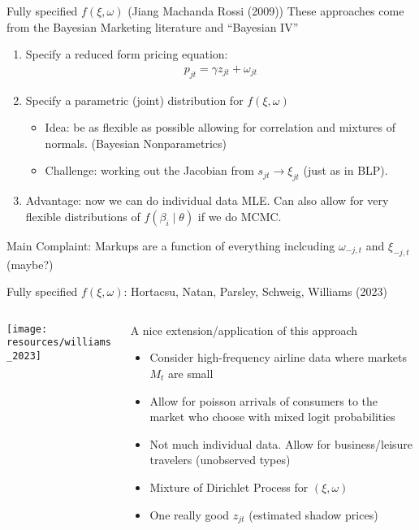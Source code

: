 \begin{frame}{Fully specified $f(\xi,\omega)$ (Jiang Machanda Rossi (2009))}
These approaches come from the Bayesian Marketing literature and ``Bayesian IV''
\begin{enumerate}
    \item Specify a reduced form pricing equation:
    \begin{align*}
        p_{jt} = \gamma z_{jt}  + \omega_{jt}
    \end{align*}
    \item Specify a parametric (joint) distribution for $f(\xi, \omega)$
    \begin{itemize}
        \item Idea: be as flexible as possible allowing for correlation and mixtures of normals. (Bayesian Nonparametrics)
        \item Challenge: working out the Jacobian from $s_{jt} \rightarrow \xi_{jt}$ (just as in BLP).
    \end{itemize}
    \item Advantage: now we can do individual data MLE. Can also allow for very flexible distributions of $f(\beta_i \mid \theta)$ if we do MCMC.
\end{enumerate}
Main Complaint: Markups are a function of \alert{everything} inclcuding $\omega_{-j,t}$ and $\xi_{-j,t}$ (maybe?)
\end{frame}

\begin{frame}{Fully specified $f(\xi,\omega)$: Hortacsu, Natan, Parsley, Schweig, Williams (2023)}

\begin{columns}
\begin{column}{0.5\textwidth}
     \texttt{[image: resources/williams\_2023]}      
\end{column}
\begin{column}{0.5\textwidth}
A nice extension/application of this approach
\begin{itemize}
    \item Consider high-frequency airline data where markets $M_t$ are \alert{small}
    \item Allow for poisson arrivals of consumers to the market who choose with mixed logit probabilities
    \item Not much individual data. Allow for business/leisure travelers (unobserved types)
    \item Mixture of Dirichlet Process for $(\xi, \omega)$
    \item One really good $z_{jt}$ (estimated shadow prices)
\end{itemize}
\end{column}
\end{columns}


\end{frame}

